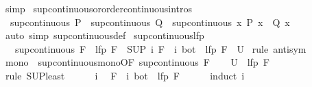 \begin{isabellebody}
\ simp%
\endisatagproof
{\isafoldproof}%
%
\isadelimproof
\isanewline
%
\endisadelimproof
\isanewline
{}\isamarkupfalse%
\ sup{\isacharunderscore}continuous{\isacharunderscore}or{\isacharbrackleft}order{\isacharunderscore}continuous{\isacharunderscore}intros{\isacharbrackright}{\isacharcolon}\isanewline
\ \ {\isachardoublequoteopen}sup{\isacharunderscore}continuous\ P\ {\isasymLongrightarrow}\ sup{\isacharunderscore}continuous\ Q\ {\isasymLongrightarrow}\ sup{\isacharunderscore}continuous\ {\isacharparenleft}{\isasymlambda}x{\isachardot}\ P\ x\ {\isasymor}\ Q\ x{\isacharparenright}{\isachardoublequoteclose}\isanewline
%
\isadelimproof
\ \ %
\endisadelimproof
%
\isatagproof
{}\isamarkupfalse%
\ {\isacharparenleft}auto\ simp{\isacharcolon}\ sup{\isacharunderscore}continuous{\isacharunderscore}def{\isacharparenright}%
\endisatagproof
{\isafoldproof}%
%
\isadelimproof
\isanewline
%
\endisadelimproof
\isanewline
{}\isamarkupfalse%
\ sup{\isacharunderscore}continuous{\isacharunderscore}lfp{\isacharcolon}\isanewline
\ \ \ {\isachardoublequoteopen}sup{\isacharunderscore}continuous\ F{\isachardoublequoteclose}\ \ {\isachardoublequoteopen}lfp\ F\ {\isacharequal}\ {\isacharparenleft}SUP\ i{\isachardot}\ {\isacharparenleft}F\ {\isacharcircum}{\isacharcircum}\ i{\isacharparenright}\ bot{\isacharparenright}{\isachardoublequoteclose}\ {\isacharparenleft}\ {\isachardoublequoteopen}lfp\ F\ {\isacharequal}\ {\isacharquery}U{\isachardoublequoteclose}{\isacharparenright}\isanewline
%
\isadelimproof
%
\endisadelimproof
%
\isatagproof
{}\isamarkupfalse%
\ {\isacharparenleft}rule\ antisym{\isacharparenright}\isanewline
\ \ \isamarkupfalse%
\ mono\ {\isacharequal}\ sup{\isacharunderscore}continuous{\isacharunderscore}mono{\isacharbrackleft}OF\ {\isacartoucheopen}sup{\isacharunderscore}continuous\ F{\isacartoucheclose}{\isacharbrackright}\isanewline
\ \ \isamarkupfalse%
\ {\isachardoublequoteopen}{\isacharquery}U\ {\isasymle}\ lfp\ F{\isachardoublequoteclose}\isanewline
\ \ \isamarkupfalse%
\ {\isacharparenleft}rule\ SUP{\isacharunderscore}least{\isacharparenright}\isanewline
\ \ \ \ \isamarkupfalse%
\ i\ \isamarkupfalse%
\ {\isachardoublequoteopen}{\isacharparenleft}F\ {\isacharcircum}{\isacharcircum}\ i{\isacharparenright}\ bot\ {\isasymle}\ lfp\ F{\isachardoublequoteclose}\isanewline
\ \ \ \ \isamarkupfalse%
\ {\isacharparenleft}induct\ i{\isacharparenright}\isanewline

\end{isabellebody}
